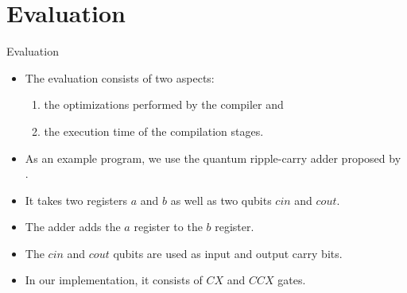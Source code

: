\section{Evaluation}
\begin{frame}{Evaluation}
    \begin{itemize}
        \item The evaluation consists of two aspects:
        \begin{enumerate}
            \item the optimizations performed by the compiler and
            \item the execution time of the compilation stages.
        \end{enumerate}
        \item As an example program, we use the quantum ripple-carry adder proposed by \cite{CDKM04}.
        \item It takes two registers $a$ and $b$ as well as two qubits $cin$ and $cout$.
        \item The adder adds the $a$ register to the $b$ register.
        \item The $cin$ and $cout$ qubits are used as input and output carry bits.
        \item In our implementation, it consists of $CX$ and $CCX$ gates.
    \end{itemize}
\end{frame}

